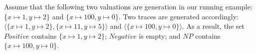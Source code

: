 %
%
Assume that the following two valuations are generation in our running example: $\{x \mapsto 1, y \mapsto 2\}$ and $\{x \mapsto 100, y \mapsto 0\}$. Two traces are generated accordingly: $\langle \{x \mapsto 1, y \mapsto 2\}, \{x \mapsto 11, y \mapsto 5\} \rangle$ and $\langle \{x \mapsto 100, y \mapsto 0\} \rangle$. As a result, the set $Positive$ contains $\{x \mapsto 1, y \mapsto 2\}$; $Negative$ is empty; and $NP$ contains $\{x \mapsto 100, y \mapsto 0\}$.

